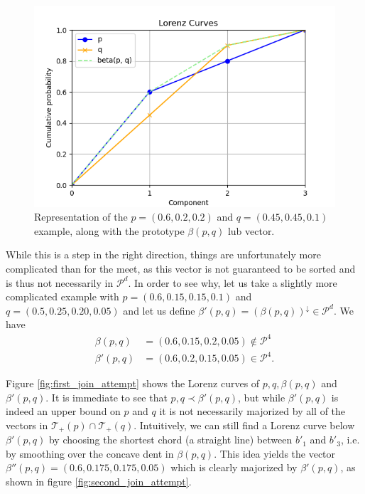 \begin{figure}[h!] 
    \centering
    \includegraphics[scale=0.6]{images/join_naive_attempt.png}
    \caption{Representation of the $p = (0.6, 0.2, 0.2)$ and $q = (0.45, 0.45, 0.1)$ example, along with the prototype $\beta(p, q)$ lub vector.} \label{fig:join_naive_attempt}
\end{figure}

While this is a step in the right direction, things are unfortunately more complicated than for the meet, as this vector is not guaranteed to be sorted and is thus not necessarily in $\mathcal{P}^d$. In order to see why, let us take a slightly more complicated example with $p = (0.6, 0.15, 0.15, 0.1)$ and $q = (0.5, 0.25, 0.20, 0.05)$ and let us define $\beta'(p, q) = (\beta(p, q))^\downarrow \in \mathcal{P}^d$. We have
\begin{align}
    \beta(p, q) &= (0.6, 0.15, 0.2, 0.05) \notin \mathcal{P}^4 \\
    \beta'(p, q) &= (0.6, 0.2, 0.15, 0.05) \in \mathcal{P}^4.
\end{align}

Figure \ref{fig:first_join_attempt} shows the Lorenz curves of $p, q, \beta(p, q)$ and $\beta'(p, q)$. It is immediate to see that $p, q \prec \beta'(p, q)$, but while $\beta'(p, q)$  is indeed an upper bound on $p$ and $q$ it is not necessarily majorized by all of the vectors in $\mathcal{T}_+(p) \cap \mathcal{T}_+(q)$. Intuitively, we can still find a Lorenz curve below $\beta'(p, q)$ by choosing the shortest chord (a straight line) between $b'_1$ and $b'_3$, i.e. by smoothing over the concave dent in $\beta(p, q)$. This idea yields the vector $\beta''(p, q) = (0.6, 0.175, 0.175, 0.05)$ which is clearly majorized by $\beta'(p, q)$, as shown in figure \ref{fig:second_join_attempt}.

